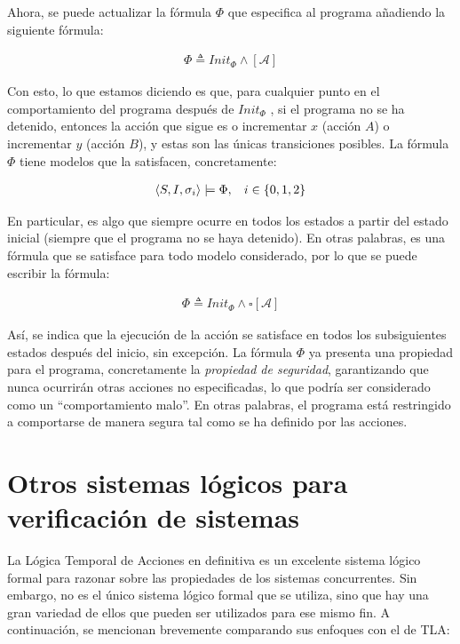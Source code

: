 Ahora, se puede actualizar la fórmula $\Phi$ que especifica al programa añadiendo la siguiente fórmula:

\begin{align*}
    \Phi \triangleq Init_{\Phi} \land [\mathcal{A}]
\end{align*}

Con esto, lo que estamos diciendo es que, para cualquier punto en el comportamiento del programa después de $Init_{\Phi}$ , si el programa no se ha detenido, entonces la acción que sigue es o incrementar $x$ (acción $A$) o incrementar $y$ (acción $B$), y estas son las únicas transiciones posibles. La fórmula $\Phi$ tiene modelos que la satisfacen, concretamente:

\begin{align*}
    \langle S, I, \sigma_i \rangle \models \Phi, \hspace{0.3cm} i \in \lbrace 0,1,2 \rbrace
\end{align*}

En particular, es algo que siempre ocurre en todos los estados a partir del estado inicial (siempre que el programa no se haya detenido). En otras palabras, es una fórmula que se satisface para todo modelo considerado, por lo que se puede escribir la fórmula:

\begin{align*}
    \Phi \triangleq Init_{\Phi} \land \square[\mathcal{A}]
\end{align*}

Así, se indica que la ejecución de la acción se satisface en todos los subsiguientes estados después del inicio, sin excepción. La fórmula $\Phi$ ya presenta una propiedad para el programa, concretamente la \textit{propiedad de seguridad}, garantizando que nunca ocurrirán otras acciones no especificadas, lo que podría ser considerado como un ``comportamiento malo''. En otras palabras, el programa está restringido a comportarse de manera segura tal como se ha definido por las acciones.

\section{Otros sistemas lógicos para verificación de sistemas}\label{section:otherlogics}
La Lógica Temporal de Acciones en definitiva es un excelente sistema lógico formal para razonar sobre las propiedades de los sistemas concurrentes. Sin embargo, no es el único sistema lógico formal que se utiliza, sino que hay una gran variedad de ellos que pueden ser utilizados para ese mismo fin. A continuación, se mencionan brevemente comparando sus enfoques con el de TLA:

